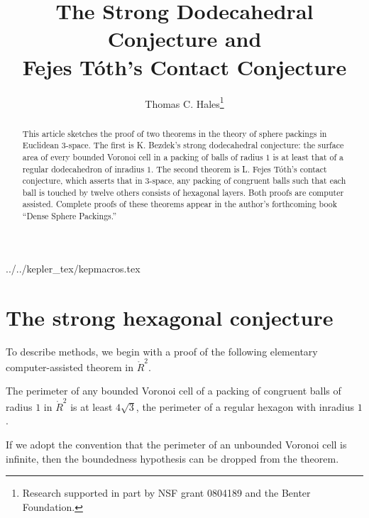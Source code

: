 \documentclass{llncs}
\begin{document}
\title{The Strong Dodecahedral Conjecture and\\ Fejes T\'oth's Contact Conjecture}
\author{Thomas C. Hales\thanks{{Research supported in part by 
NSF grant 0804189 and the Benter Foundation.}}}
\maketitle


\begin{abstract} This article sketches the proof of two theorems in
  the theory of sphere packings in Euclidean $3$-space.  The first is
  K. Bezdek's strong dodecahedral conjecture: the surface area of
  every bounded Voronoi cell in a packing of balls of radius $1$ is at least
  that of a regular dodecahedron of inradius $1$.  The second theorem
  is L. Fejes T\'oth's contact conjecture, which asserts that in
  $3$-space, any packing of congruent balls such that each ball is
  touched by twelve others consists of hexagonal layers.  Both proofs
  are computer assisted.  Complete proofs of these theorems
  appear in the author's forthcoming book ``Dense Sphere Packings.''
\end{abstract}

 {../../kepler_tex/kepmacros.tex}

\section{The strong hexagonal conjecture}

To describe methods, we begin with a  proof of the following elementary computer-assisted
theorem in $\ring{R}^2$.  

\begin{theorem}  The perimeter of any bounded Voronoi cell of a packing of congruent balls of radius $1$
in $\ring{R}^2$ is at least $4\sqrt{3}$, the perimeter of a regular hexagon with inradius $1$.
\end{theorem}

If we adopt the convention that the perimeter of an unbounded Voronoi cell is infinite, then
the boundedness hypothesis can be dropped from the theorem.
\end{document}
